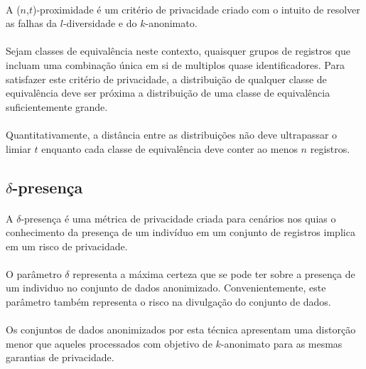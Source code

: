 \paragraph{} A ($n$,$t$)-proximidade\cite{tproximity} é um critério de privacidade criado com o intuito de resolver as falhas da $l$-diversidade e do $k$-anonimato.

\paragraph{} Sejam classes de equivalência neste contexto, quaisquer grupos de registros que incluam uma combinação única em si de multiplos quase identificadores. Para satisfazer este critério de privacidade, a distribuição de qualquer classe de equivalência deve ser próxima a distribuição de uma classe de equivalência suficientemente grande.

\paragraph{} Quantitativamente, a distância entre as distribuições não deve ultrapassar o limiar $t$ enquanto cada classe de equivalência deve conter ao menos $n$ registros.

\subsection{$\delta$-presença}

\paragraph{} A $\delta$-presença\cite{deltapresence} é uma métrica de privacidade criada para cenários nos quias o conhecimento da presença de um indivíduo em um conjunto de registros implica em um risco de privacidade.

\paragraph{} O parâmetro $\delta$ representa a máxima certeza que se pode ter sobre a presença de um individuo no conjunto de dados anonimizado. Convenientemente, este parâmetro também representa o risco na divulgação do conjunto de dados.

\paragraph{} Os conjuntos de dados anonimizados por esta técnica apresentam uma distorção menor que aqueles processados com objetivo de $k$-anonimato para as mesmas garantias de privacidade.


